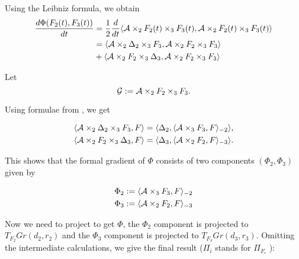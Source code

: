 
Using the Leibniz formula, we obtain
\begin{equation}
\begin{split}
\frac{d\Phi(F_2(t), F_3(t))} {dt} &= \frac{1}{2} \frac{d}{dt} \langle \mathcal{A} \times_2 F_2(t) \times_3 F_3(t), \mathcal{A} \times_2 F_2(t) \times_3 F_3(t) \rangle   \\
 &= \langle \mathcal{A} \times_2 \Delta_2 \times_3 F_3, \mathcal{A} \times_2 F_2 \times_3 F_3 \rangle  \\ 
 & +  \langle \mathcal{A} \times_2 F_2 \times_3 \Delta_3 , \mathcal{A} \times_2 F_2 \times_3 F_3 \rangle 
 \end{split}
\end{equation}

Let
\begin{equation}
\mathcal{G} := \mathcal{A} \times_2 {F_2} \times_3 {F_3}.
\end{equation}

Using formulae from \cite{elden_savas_2007}, we get

\begin{eqnarray}
\langle \mathcal{A} \times_2 \Delta{_2} \times_3 {F_3}, F \rangle = \langle \Delta{_2}, \langle  \mathcal{A} \times_3 {F_3}, F \rangle _{-2} \rangle, \\
\langle \mathcal{A} \times_2 {F_2} \times_3 \Delta{_3}, F \rangle = \langle \Delta{_3}, \langle  \mathcal{A} \times_2 {F_2}, F \rangle _{-3} \rangle.
\end{eqnarray}

This shows that the formal gradient of $\Phi$ consists of two components $(\Phi_2, \Phi_3)$
given by

\begin{eqnarray}
\label{formal_grad_phi}
\Phi{_2} := \langle  \mathcal{A} \times_3 {F_3}, F \rangle _{-2} \\
\Phi{_3} := \langle  \mathcal{A} \times_2 {F_2}, F \rangle _{-3}
\end{eqnarray}

Now we need to project to get $\Phi$, the $\Phi_2$ component is projected to $T_{F_2}Gr(d_2, r_2)$ and
the $\Phi_3$ component is projected to $T_{F_3}Gr(d_3, r_3)$. Omitting the intermediate calculations,
we give the final result ($\Pi_i$ stands for $\Pi_{F_i}$ ):

